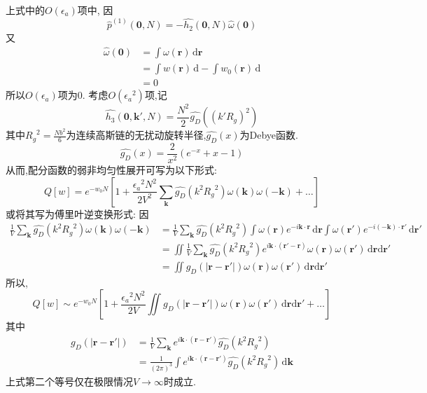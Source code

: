 上式中的$O(\epsilon_a)$项中,
因$$\hat{p}^{(1)}(\mathbf{0},N) = -\hat{h_2}(\mathbf{0},N) \hat{\omega}(\mathbf{0})$$
又
$$
\begin{aligned}
	\hat{\omega}(\mathbf{0}) &= \int \omega(\mathbf{r})\,\mathrm{d}{\mathbf{r}} \\
	&= \int w(\mathbf{r})\,\mathrm{d}-\int {w_0}(\mathbf{r})\,\mathrm{d} \\
	&= 0
\end{aligned}
$$
所以$O(\epsilon_a)$项为0.
考虑$O({\epsilon_a}^2)$项,记
\begin{equation}
\hat{h_3}(\mathbf{0},\mathbf{k}',N) = \frac{N^2}{2} \hat{g_D}((k' R_g)^2)
\end{equation}
其中${R_g}^2 = \frac{N b^2}{6}$为连续高斯链的无扰动旋转半径,$\hat{g_D}(x)$为Debye函数.
\begin{equation}
\hat{g_D}(x) = \frac{2}{x^2}(e^{-x}+x-1)
\end{equation}
从而,配分函数的弱非均匀性展开可写为以下形式:
\begin{equation}
Q[w] = e^{-w_0 N}[1+\frac{{\epsilon_a}^2 N^2}{2 V^2} \sum_{\mathbf{k}} \hat{g_D}(k^2 {R_g}^2) \omega(\mathbf{k}) \omega(-\mathbf{k})+\dots]
\end{equation}
或将其写为傅里叶逆变换形式:
因
$$
\begin{aligned}
\frac{1}{V} \sum_{\mathbf{k}} \hat{g_D}(k^2 {R_g}^2) \omega(\mathbf{k}) \omega(-\mathbf{k}) &= \frac{1}{V} \sum_{\mathbf{k}} \hat{g_D}(k^2 {R_g}^2) \int \omega(\mathbf{r}) e^{-i \mathbf{k} \cdot \mathbf{r}}\,\mathrm{d} \mathbf{r} \int \omega(\mathbf{r}') e^{-i (-\mathbf{k}) \cdot \mathbf{r}'}\,\mathrm{d} \mathbf{r}' \\ 
 &= \iint \frac{1}{V} \sum_{\mathbf{k}} \hat{g_D}(k^2 {R_g}^2) e^{i\mathbf{k} \cdot (\mathbf{r}'-\mathbf{r})} \omega(\mathbf{r}) \omega(\mathbf{r}')\,\mathrm{d} \mathbf{r} \mathrm{d} \mathbf{r}'\\
 &= \iint g_D(|\mathbf{r}-\mathbf{r}'|) \omega(\mathbf{r}) \omega(\mathbf{r}')\,\mathrm{d} \mathbf{r} \mathrm{d} \mathbf{r}'
\end{aligned}
$$
所以,
\begin{equation}
Q[w] \sim e^{-w_0 N}[1+\frac{{\epsilon_a}^2 N^2}{2 V}\iint g_D(|\mathbf{r}-\mathbf{r}'|) \omega(\mathbf{r}) \omega(\mathbf{r}')\,\mathrm{d} \mathbf{r} \mathrm{d} \mathbf{r}'+\dots] \label{3.132}
\end{equation}
其中
\begin{equation}
\begin{aligned}
g_D(|\mathbf{r}-\mathbf{r}'|) &= \frac{1}{V}\sum_{\mathbf{k}}e^{i\mathbf{k} \cdot (\mathbf{r}-\mathbf{r}')} \hat{g_D}(k^2 {R_g}^2)\\
 &= \frac{1}{(2\pi)^3} \int e^{i\mathbf{k} \cdot (\mathbf{r}-\mathbf{r}')} \hat{g_D}(k^2 {R_g}^2)\,\mathrm{d} \mathbf{k}
\end{aligned}
\label{3.133}
\end{equation}
上式第二个等号仅在极限情况$V \rightarrow \infty $时成立.

